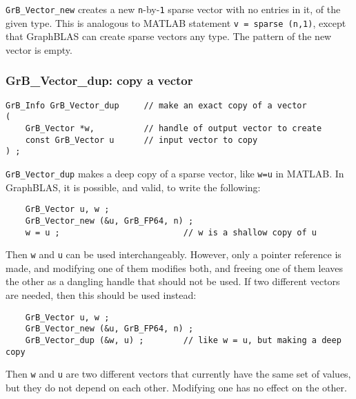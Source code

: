 \documentclass[12pt]{article}
\begin{document}
\verb'GrB_Vector_new' creates a new \verb'n'-by-\verb'1' sparse vector with no
entries in it, of the given type.  This is analogous to MATLAB statement
\verb'v = sparse (n,1)', except that GraphBLAS can create sparse vectors any
type.  The pattern of the new vector is empty.

\subsubsection{{\sf GrB\_Vector\_dup:}           copy a vector}
\label{vector_dup}

\begin{mdframed}[userdefinedwidth=6in]
{\footnotesize
\begin{verbatim}
GrB_Info GrB_Vector_dup     // make an exact copy of a vector
(
    GrB_Vector *w,          // handle of output vector to create
    const GrB_Vector u      // input vector to copy
) ;
\end{verbatim}
} \end{mdframed}

\verb'GrB_Vector_dup' makes a deep copy of a sparse vector, like \verb'w=u' in
MATLAB.  In GraphBLAS, it is possible, and valid, to write the following:

    {\footnotesize
    \begin{verbatim}
    GrB_Vector u, w ;
    GrB_Vector_new (&u, GrB_FP64, n) ;
    w = u ;                         // w is a shallow copy of u  \end{verbatim}}

Then \verb'w' and \verb'u' can be used interchangeably.  However, only a pointer
reference is made, and modifying one of them modifies both, and freeing one of
them leaves the other as a dangling handle that should not be used.
If two different vectors are needed, then this should be used instead:

    {\footnotesize
    \begin{verbatim}
    GrB_Vector u, w ;
    GrB_Vector_new (&u, GrB_FP64, n) ;
    GrB_Vector_dup (&w, u) ;        // like w = u, but making a deep copy \end{verbatim}}

Then \verb'w' and \verb'u' are two different vectors that currently have the
same set of values, but they do not depend on each other.  Modifying one has
no effect on the other.
\end{document}
